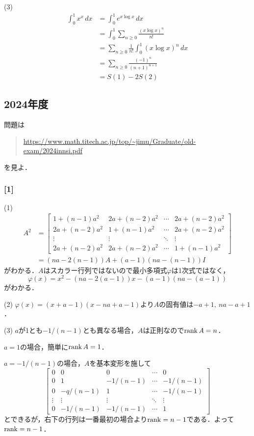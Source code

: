 \documentclass[a4j]{ltjsarticle}
\newcommand{\1}{\mathbbm{1}}
\numberwithin{equation}{section}
\theoremstyle{definition}
\begin{document}
(3) 
\begin{align}
    \int_{0}^{1}x^{x}\,dx&=\int_0^1 e^{x\log x}\,dx\\
    &=\int_{0}^1 \sum_{n\geq 0}\frac{(x\log x)^n}{n!}\\
    &=\sum_{n\geq0}\frac{1}{n!}\int_{0}^1 (x\log x)^n\,dx\\
    &=\sum_{n\geq 0}\frac{(-1)^n}{(n+1)^{n+1}}\\
    &=S(1)-2S(2)
\end{align}
\subsection{2024年度}
問題は
\begin{quote}
    \url{https://www.math.titech.ac.jp/top/~jimu/Graduate/old-exam/2024innsi.pdf}
\end{quote}
を見よ．
\subsubsection*{[1]}
(1) 
\begin{align}
    A^2&=\begin{bmatrix}
        1+(n-1)a^2 & 2a+(n-2)a^2 & \cdots & 2a+(n-2)a^2 \\ 
        2a+(n-2)a^2 & 1+(n-1)a^2 & \cdots & 2a+(n-2)a^2 \\
        \vdots & \vdots & \ddots & \vdots \\
        2a+(n-2)a^2 & 2a+(n-2)a^2 & \cdots & 1+(n-1)a^2
    \end{bmatrix}\\
    &=(na-2(n-1))A+(a-1)(na-(n-1))I
\end{align}
がわかる．$A$はスカラー行列ではないので最小多項式$\varphi$は1次式ではなく，
\begin{equation}
    \varphi(x)=x^2-(na-2(a-1))x-(a-1)(na-(a-1))
\end{equation}
がわかる．

(2) $\varphi(x)=(x+a-1)(x-na+a-1)$より$A$の固有値は$-a+1,\ na-a+1$．

(3) $a$が1とも$-1/(n-1)$とも異なる場合，$A$は正則なので$\rank A=n$．

$a=1$の場合，簡単に$\rank A=1$．

$a=-1/(n-1)$の場合，$A$を基本変形を施して
\begin{equation}
    \begin{bmatrix}
        0 & 0 & 0 & \cdots & 0 \\
        0 & 1 & -1/(n-1) & \cdots & -1/(n-1) \\
        0 & -q/(n-1) & 1 & \cdots & -1/(n-1) \\
        \vdots & \vdots & \vdots & \ddots & \vdots \\
        0 & -1/(n-1) & -1/(n-1) & \cdots & 1
    \end{bmatrix}
\end{equation}
とできるが，右下の行列は一番最初の場合より$\rank=n-1$である．よって$\rank=n-1$．
\end{document}
